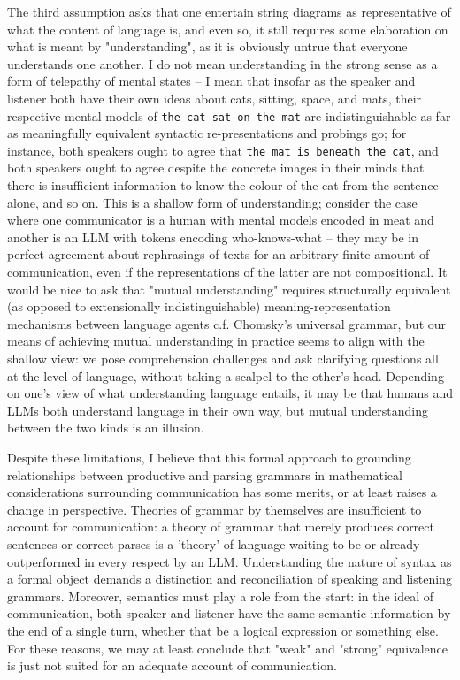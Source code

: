 
The third assumption asks that one entertain string diagrams as representative of what the content of language is, and even so, it still requires some elaboration on what is meant by "understanding", as it is obviously untrue that everyone understands one another. I do not mean understanding in the strong sense as a form of telepathy of mental states -- I mean that insofar as the speaker and listener both have their own ideas about cats, sitting, space, and mats, their respective mental models of \texttt{the cat sat on the mat} are indistinguishable as far as meaningfully equivalent syntactic re-presentations and probings go; for instance, both speakers ought to agree that \texttt{the mat is beneath the cat}, and both speakers ought to agree despite the concrete images in their minds that there is insufficient information to know the colour of the cat from the sentence alone, and so on. This is a shallow form of understanding; consider the case where one communicator is a human with mental models encoded in meat and another is an LLM with tokens encoding who-knows-what -- they may be in perfect agreement about rephrasings of texts for an arbitrary finite amount of communication, even if the representations of the latter are not compositional. It would be nice to ask that "mutual understanding" requires structurally equivalent (as opposed to extensionally indistinguishable) meaning-representation mechanisms between language agents c.f. Chomsky's universal grammar, but our means of achieving mutual understanding in practice seems to align with the shallow view: we pose comprehension challenges and ask clarifying questions all at the level of language, without taking a scalpel to the other's head. Depending on one's view of what understanding language entails, it may be that humans and LLMs both understand language in their own way, but mutual understanding between the two kinds is an illusion.

\newpage
{}

Despite these limitations, I believe that this formal approach to grounding relationships between productive and parsing grammars in mathematical considerations surrounding communication has some merits, or at least raises a change in perspective. Theories of grammar by themselves are insufficient to account for communication: a theory of grammar that merely produces correct sentences or correct parses is a 'theory' of language waiting to be or already outperformed in every respect by an LLM. Understanding the nature of syntax as a formal object demands a distinction and reconciliation of speaking and listening grammars. Moreover, semantics must play a role from the start: in the ideal of communication, both speaker and listener have the same semantic information by the end of a single turn, whether that be a logical expression or something else. For these reasons, we may at least conclude that "weak" and "strong" equivalence is just not suited for an adequate account of communication.\\

